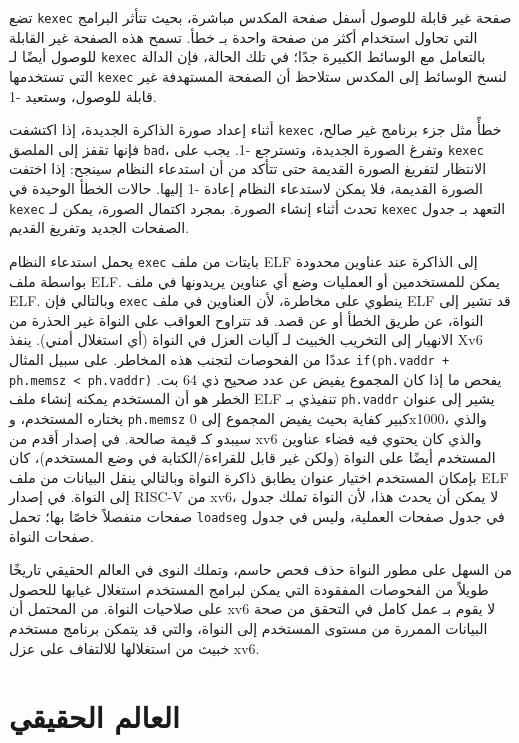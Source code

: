 تضع \lstinline{kexec} صفحة غير قابلة للوصول أسفل صفحة المكدس مباشرة، بحيث تتأثر البرامج التي تحاول استخدام أكثر من صفحة واحدة بـ خطأ.
تسمح هذه الصفحة غير القابلة للوصول أيضًا لـ \lstinline{kexec} بالتعامل مع الوسائط الكبيرة جدًا؛
في تلك الحالة، فإن الدالة  التي تستخدمها \lstinline{kexec} لنسخ الوسائط إلى المكدس ستلاحظ أن الصفحة المستهدفة غير قابلة للوصول، وستعيد -1.

أثناء إعداد صورة الذاكرة الجديدة، إذا اكتشفت \lstinline{kexec} خطأً مثل جزء برنامج غير صالح، فإنها تقفز إلى الملصق \lstinline{bad}، وتفرغ الصورة الجديدة، وتسترجع -1.
يجب على \lstinline{kexec} الانتظار لتفريغ الصورة القديمة حتى تتأكد من أن استدعاء النظام سينجح:
إذا اختفت الصورة القديمة، فلا يمكن لاستدعاء النظام إعادة -1 إليها.
حالات الخطأ الوحيدة في \lstinline{kexec} تحدث أثناء إنشاء الصورة.
بمجرد اكتمال الصورة، يمكن لـ \lstinline{kexec} التعهد بـ جدول الصفحات الجديد وتفريغ القديم.

يحمل استدعاء النظام \lstinline{exec} بايتات من ملف ELF إلى الذاكرة عند عناوين محدودة بواسطة ملف ELF.
يمكن للمستخدمين أو العمليات وضع أي عناوين يريدونها في ملف ELF.
وبالتالي فإن \lstinline{exec} ينطوي على مخاطرة، لأن العناوين في ملف ELF قد تشير إلى النواة، عن طريق الخطأ أو عن قصد.
قد تتراوح العواقب على النواة غير الحذرة من الانهيار إلى التخريب الخبيث لـ آليات العزل في النواة (أي استغلال أمني).
ينفذ Xv6 عددًا من الفحوصات لتجنب هذه المخاطر.
على سبيل المثال \lstinline{if(ph.vaddr + ph.memsz < ph.vaddr)} يفحص ما إذا كان المجموع يفيض عن عدد صحيح ذي 64 بت.
الخطر هو أن المستخدم يمكنه إنشاء ملف ELF تنفيذي بـ \lstinline{ph.vaddr} يشير إلى عنوان يختاره المستخدم،
و \lstinline{ph.memsz} كبير كفاية بحيث يفيض المجموع إلى 0x1000، والذي سيبدو كـ قيمة صالحة.
في إصدار أقدم من xv6 والذي كان يحتوي فيه فضاء عناوين المستخدم أيضًا على النواة (ولكن غير قابل للقراءة/الكتابة في وضع المستخدم)، كان بإمكان المستخدم اختيار عنوان يطابق ذاكرة النواة وبالتالي ينقل البيانات من ملف ELF إلى النواة.
في إصدار RISC-V من xv6، لا يمكن أن يحدث هذا، لأن النواة تملك جدول صفحات منفصلاً خاصًا بها؛
تحمل \lstinline{loadseg} في جدول صفحات العملية، وليس في جدول صفحات النواة.

من السهل على مطور النواة حذف فحص حاسم، وتملك النوى في العالم الحقيقي تاريخًا طويلاً من الفحوصات المفقودة التي يمكن لبرامج المستخدم استغلال غيابها للحصول على صلاحيات النواة.
من المحتمل أن xv6 لا يقوم بـ عمل كامل في التحقق من صحة البيانات الممررة من مستوى المستخدم إلى النواة، والتي قد يتمكن برنامج مستخدم خبيث من استغلالها للالتفاف على عزل xv6.

\section{العالم الحقيقي}
\label{sec:real_world_mem}

